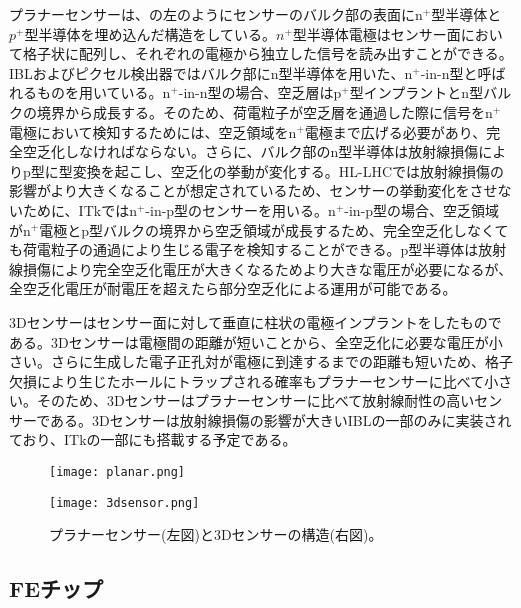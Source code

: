 プラナーセンサーは、の左のようにセンサーのバルク部の表面にn$^+$型半導体と$p^+$型半導体を埋め込んだ構造をしている。$n^+$型半導体電極はセンサー面において格子状に配列し、それぞれの電極から独立した信号を読み出すことができる。IBLおよびピクセル検出器ではバルク部にn型半導体を用いた、n$^{+}$-in-n型と呼ばれるものを用いている。n$^{+}$-in-n型の場合、空乏層はp$^{+}$型インプラントとn型バルクの境界から成長する。そのため、荷電粒子が空乏層を通過した際に信号をn$^{+}$電極において検知するためには、空乏領域をn$^{+}$電極まで広げる必要があり、完全空乏化しなければならない。さらに、バルク部のn型半導体は放射線損傷によりp型に型変換を起こし、空乏化の挙動が変化する。HL-LHCでは放射線損傷の影響がより大きくなることが想定されているため、センサーの挙動変化をさせないために、ITkではn$^{+}$-in-p型のセンサーを用いる。n$^{+}$-in-p型の場合、空乏領域がn$^{+}$電極とp型バルクの境界から空乏領域が成長するため、完全空乏化しなくても荷電粒子の通過により生じる電子を検知することができる。p型半導体は放射線損傷により完全空乏化電圧が大きくなるためより大きな電圧が必要になるが、全空乏化電圧が耐電圧を超えたら部分空乏化による運用が可能である。


3Dセンサーはセンサー面に対して垂直に柱状の電極インプラントをしたものである。3Dセンサーは電極間の距離が短いことから、全空乏化に必要な電圧が小さい。さらに生成した電子正孔対が電極に到達するまでの距離も短いため、格子欠損により生じたホールにトラップされる確率もプラナーセンサーに比べて小さい。そのため、3Dセンサーはプラナーセンサーに比べて放射線耐性の高いセンサーである。3Dセンサーは放射線損傷の影響が大きいIBLの一部のみに実装されており、ITkの一部にも搭載する予定である。

\begin{figure}[tbp]
  \begin{minipage}[b]{0.45\linewidth}
    \centering
    \texttt{[image: planar.png]}
  \end{minipage}
  \begin{minipage}[b]{0.45\linewidth}
    \centering
    \texttt{[image: 3dsensor.png]}
  \end{minipage}
  \caption[プラナーセンサーと3Dセンサーの構造]{プラナーセンサー(左図)と3Dセンサーの構造(右図)。}
  \label{fig:3dplanar}
\end{figure}


\subsection{FEチップ}
\label{sec:ASIC}

